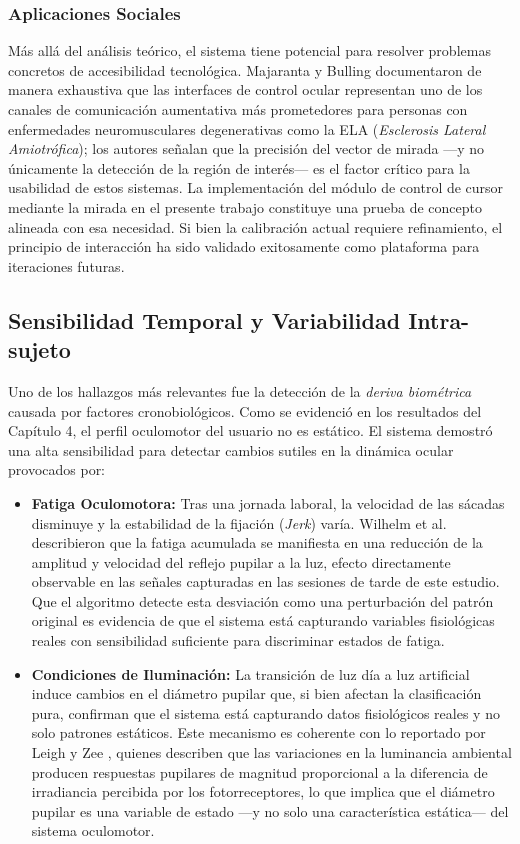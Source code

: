 \subsubsection{Aplicaciones Sociales}

Más allá del análisis teórico, el sistema tiene potencial para resolver problemas concretos de accesibilidad tecnológica.
Majaranta y Bulling \cite{majaranta2014eye} documentaron de manera exhaustiva que las interfaces de control ocular representan uno de los canales de comunicación aumentativa más prometedores para personas con enfermedades neuromusculares degenerativas como la ELA (\textit{Esclerosis Lateral Amiotrófica});
los autores señalan que la precisión del vector de mirada —y no únicamente la detección de la región de interés— es el factor crítico para la usabilidad de estos sistemas.
La implementación del módulo de control de cursor mediante la mirada en el presente trabajo constituye una prueba de concepto alineada con esa necesidad.
Si bien la calibración actual requiere refinamiento, el principio de interacción ha sido validado exitosamente como plataforma para iteraciones futuras.
\subsection{Sensibilidad Temporal y Variabilidad Intra-sujeto}

Uno de los hallazgos más relevantes fue la detección de la \textit{deriva biométrica} causada por factores cronobiológicos.
Como se evidenció en los resultados del Capítulo 4, el perfil oculomotor del usuario no es estático.
El sistema demostró una alta sensibilidad para detectar cambios sutiles en la dinámica ocular provocados por:

\begin{itemize}
	\item \textbf{Fatiga Oculomotora:} Tras una jornada laboral, la velocidad de las sácadas disminuye y la estabilidad de la fijación (\textit{Jerk}) varía.
	Wilhelm et al. \cite{wilhelm2001pupil} describieron que la fatiga acumulada se manifiesta en una reducción de la amplitud y velocidad del reflejo pupilar a la luz, efecto directamente observable en las señales capturadas en las sesiones de tarde de este estudio.
	Que el algoritmo detecte esta desviación como una perturbación del patrón original es evidencia de que el sistema está capturando variables fisiológicas reales con sensibilidad suficiente para discriminar estados de fatiga.
	\item \textbf{Condiciones de Iluminación:} La transición de luz día a luz artificial induce cambios en el diámetro pupilar que, si bien afectan la clasificación pura, confirman que el sistema está capturando datos fisiológicos reales y no solo patrones estáticos.
	Este mecanismo es coherente con lo reportado por Leigh y Zee \cite{leigh2015neurology}, quienes describen que las variaciones en la luminancia ambiental producen respuestas pupilares de magnitud proporcional a la diferencia de irradiancia percibida por los fotorreceptores, lo que implica que el diámetro pupilar es una variable de estado —y no solo una característica estática— del sistema oculomotor.
\end{itemize}

